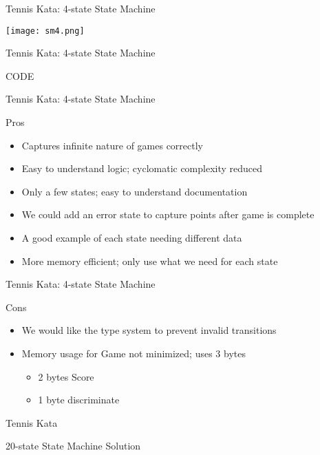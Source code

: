 \documentclass[aspectratio=169]{beamer}
\begin{document}
\begin{frame}{Tennis Kata: 4-state State Machine}
\begin{center}
\texttt{[image: sm4.png]}
\end{center}
\end{frame}

\begin{frame}{Tennis Kata: 4-state State Machine}
\begin{center}
\begin{Huge}
CODE
\end{Huge}
\end{center}
\end{frame}

\begin{frame}{Tennis Kata: 4-state State Machine}
\begin{block}{Pros}
\begin{itemize}
\item Captures infinite nature of games correctly
\item Easy to understand logic; cyclomatic complexity reduced
\item Only a few states; easy to understand documentation
\item We could add an error state to capture points after game is complete
\item A good example of each state needing different data
\item More memory efficient; only use what we need for each state
\end{itemize}
\end{block}
\end{frame}

\begin{frame}{Tennis Kata: 4-state State Machine}
\begin{block}{Cons}
\begin{itemize}
\item We would like the type system to prevent invalid transitions
\item Memory usage for Game not minimized; uses 3 bytes
	\begin{itemize}
	\item 2 bytes Score
	\item 1 byte discriminate
	\end{itemize}
\end{itemize}
\end{block}
\end{frame}

\begin{frame}{Tennis Kata}
\begin{Huge}20-state State Machine Solution
\end{Huge}
\end{frame}
\end{document}
